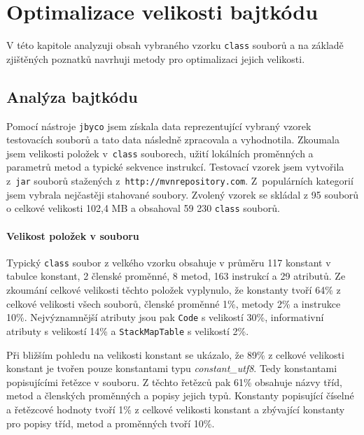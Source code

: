 \chapter{Optimalizace velikosti bajtkódu}\label{Tool}

V této kapitole analyzuji obsah vybraného vzorku \texttt{class} souborů a na základě zjištěných poznatků navrhuji metody pro optimalizaci jejich velikosti. 

\section{Analýza bajtkódu}\label{Analysis}


Pomocí nástroje \texttt{jbyco} jsem získala data reprezentující vybraný vzorek testovacích souborů a tato data následně zpracovala a vyhodnotila. Zkoumala jsem velikosti položek v~\texttt{class} souborech, užití lokálních proměnných a parametrů metod a typické sekvence instrukcí. Testovací vzorek jsem vytvořila z~\texttt{jar} souborů stažených z~\texttt{http://mvnrepository.com}. Z~populárních kategorií jsem vybrala nejčastěji stahované soubory. Zvolený vzorek se skládal z 95 souborů o celkové velikosti 102,4 MB a obsahoval 59 230 \texttt{class} souborů.

\subsubsection{Velikost položek v souboru}

Typický \texttt{class} soubor z velkého vzorku obsahuje v průměru 117 konstant v tabulce konstant, 2 členské proměnné, 8 metod, 163 instrukcí a 29 atributů. Ze zkoumání celkové velikosti těchto položek vyplynulo, že konstanty tvoří 64\% z celkové velikosti všech souborů, členské proměnné 1\%, metody 2\% a instrukce 10\%.
Nejvýznamnější atributy jsou pak \texttt{Code} s velikostí 30\%, informativní atributy s velikostí 14\% a \texttt{StackMapTable} s velikostí 2\%.

Při bližším pohledu na velikosti konstant se ukázalo, že 89\% z celkové velikosti konstant je tvořen pouze konstantami typu \textit{constant\_utf8}. Tedy konstantami popisujícími řetězce v souboru. Z těchto řetězců pak 61\% obsahuje názvy tříd, metod a členských proměnných a popisy jejich typů. Konstanty popisující číselné a řetězcové hodnoty tvoří 1\% z celkové velikosti konstant a zbývající konstanty pro popisy tříd, metod a proměnných tvoří 10\%.

